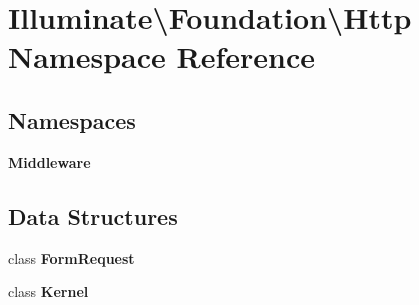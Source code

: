\section{Illuminate\textbackslash{}Foundation\textbackslash{}Http Namespace Reference}
\label{namespace_illuminate_1_1_foundation_1_1_http}
\subsection*{Namespaces}
\begin{DoxyCompactItemize}
\item 
 {\bf Middleware}
\end{DoxyCompactItemize}
\subsection*{Data Structures}
\begin{DoxyCompactItemize}
\item 
class {\bf Form\+Request}
\item 
class {\bf Kernel}
\end{DoxyCompactItemize}
